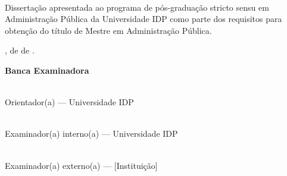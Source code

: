 \begin{titlepage}

\begin{center}
{\large \textbf{\MakeUppercase{\autora}}}\\[1.5cm]

{\Large \textbf{\tituloDissertacao}}
\end{center}

\vspace{1.5cm}

\begin{flushright}
\begin{minipage}{0.52\textwidth}
\singlespacing
Dissertação apresentada ao programa de pós-graduação stricto sensu em Administração Pública da Universidade IDP como parte dos requisitos para obtenção do título de Mestre em Administração Pública.
\end{minipage}
\end{flushright}

\vspace{1.5cm}

\begin{center}
\localDissertacao, \underline{\hspace{1.2cm}} de \underline{\hspace{3cm}} de \anoDissertacao.

\vspace{1.5cm}

\textbf{Banca Examinadora}

\vspace{1.2cm}
\orientadorDissertacao\\
Orientador(a) — Universidade IDP

\vspace{1.2cm}
\underline{\hspace{10cm}}\\
Examinador(a) interno(a) — Universidade IDP

\vspace{1.2cm}
\underline{\hspace{10cm}}\\
Examinador(a) externo(a) — [Instituição]
\end{center}

\end{titlepage}
